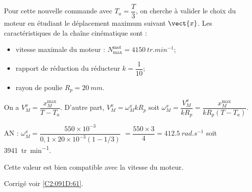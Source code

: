 \else
\fi

\ifprof
\else
Pour cette nouvelle commande avec $T_a=\dfrac{T}{3}$, on cherche à valider le choix du moteur en étudiant le
déplacement maximum suivant $\vect{x}$. Les caractéristiques de la chaîne cinématique sont :
\begin{itemize}
\item vitesse maximale du moteur : $N_{\text{max}}^{\text{mot}}=\SI{4150}{tr.min^{-1}}$;
\item rapport de réduction du réducteur $k=\dfrac{1}{10}$;
\item rayon de poulie $R_p= \SI{20}{mm}$.
\end{itemize}
\fi

\ifprof
On a  $V_M^x=\dfrac{x_M^{\text{max}}}{T-T_a}$. D'autre part, 
$V_M^x = \omega_M^x  k R_p $ soit $\omega_M^x  = \dfrac{V_M^x}{ k R_p} =  \dfrac{{x_M^{\text{max}}}}{ k R_p\left({T-T_a} \right)} $.

AN : $\omega_M^x  = \dfrac{550\times 10^{-3}}{ 0,1 \times 20 \times 10^{-3} \left(1-1/3 \right)} $
$ =  \dfrac{550\times 3}{ 4}= \SI{412,5}{rad.s^{-1}} $ soit \SI{3941}{tr.min^{-1}}.

Cette valeur est bien compatible avec la vitesse du moteur.
\else
\fi


\ifprof
\else
\begin{flushright}
\footnotesize{Corrigé  voir \ref{C2:091D:61}.}
\end{flushright}%
\fi